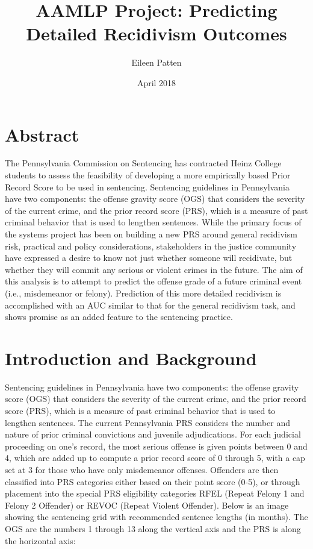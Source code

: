 \documentclass{article}
\title{AAMLP Project: Predicting Detailed Recidivism Outcomes}
\author{Eileen Patten}
\date{April 2018}
\begin{document}
\maketitle

\section{Abstract}

The Pennsylvania Commission on Sentencing has contracted Heinz College students to assess the feasibility of developing a more empirically based Prior Record Score to be used in sentencing. Sentencing guidelines in Pennsylvania have two components: the offense gravity score (OGS) that considers the severity of the current crime, and the prior record score (PRS), which is a measure of past criminal behavior that is used to lengthen sentences. While the primary focus of the systems project has been on building a new PRS around general recidivism risk, practical and policy considerations, stakeholders in the justice community have expressed a desire to know not just whether someone will recidivate, but whether they will commit any serious or violent crimes in the future. The aim of this analysis is to attempt to predict the offense grade of a future criminal event (i.e., misdemeanor or felony). Prediction of this more detailed recidivism is accomplished with an AUC similar to that for the general recidivism task, and shows promise as an added feature to the sentencing practice.

\section{Introduction and Background}
Sentencing guidelines in Pennsylvania have two components: the offense gravity score (OGS) that considers the severity of the current crime, and the prior record score (PRS), which is a measure of past criminal behavior that is used to lengthen sentences.\cite{code} The current Pennsylvania PRS considers the number and nature of prior criminal convictions and juvenile adjudications. For each judicial proceeding on one's record, the most serious offense is given points between 0 and 4, which are added up to compute a prior record score of 0 through 5, with a cap set at 3 for those who have only misdemeanor offenses. Offenders are then classified into PRS categories either based on their point score (0-5), or through placement into the special PRS eligibility categories RFEL (Repeat Felony 1 and Felony 2 Offender) or REVOC (Repeat Violent Offender). Below is an image showing the sentencing grid with recommended sentence lengths (in months). The OGS are the numbers 1 through 13 along the vertical axis and the PRS is along the horizontal axis:
\end{document}
